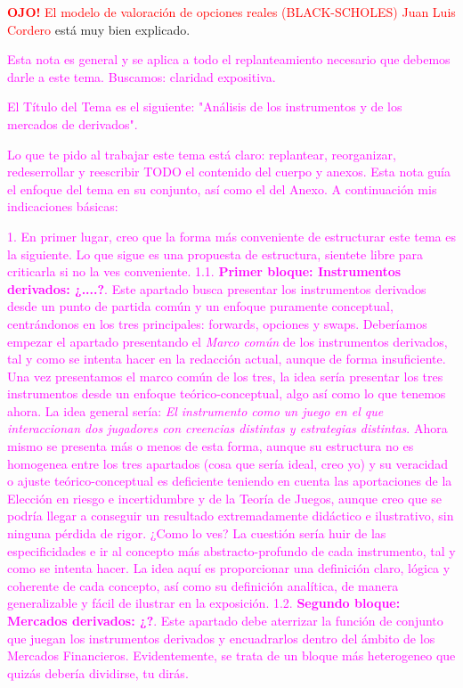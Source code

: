 \documentclass[10pt,a4paper]{article}
\newcommand{\modificaciones}[1]{
  \begin{tcolorbox}[
    colback=white,
    colframe=red,
    title={Modificaciones a realizar},
    before upper={\setlength{\parindent}{0.5cm}\setlength{\parskip}{0.5\baselineskip}}
  ]
  #1
  \end{tcolorbox}
}
\newcounter{anexo}
\begin{document}
\modificaciones{
    \textcolor{red}{\textbf{OJO!} El modelo de valoración de opciones reales (BLACK-SCHOLES) Juan Luis Cordero} está muy bien explicado.

    \textcolor{magenta}{Esta nota es general y se aplica a todo el replanteamiento necesario que debemos darle a este tema. Buscamos: claridad expositiva.

    El Título del Tema es el siguiente: "Análisis de los instrumentos y de los mercados de derivados".

    Lo que te pido al trabajar este tema está claro: replantear, reorganizar, redeserrollar y reescribir TODO el contenido del cuerpo y anexos. Esta nota guía el enfoque del tema en su conjunto, así como el del Anexo. A continuación mis indicaciones básicas:
    
    1. En primer lugar, creo que la forma más conveniente de estructurar este tema es la siguiente. Lo que sigue es una propuesta de estructura, sientete libre para criticarla si no la ves conveniente.
    1.1. \textbf{Primer bloque: Instrumentos derivados: ¿....?}. Este apartado busca presentar los instrumentos derivados desde un punto de partida común y un enfoque puramente conceptual, centrándonos en los tres principales: forwards, opciones y swaps. Deberíamos empezar el apartado presentando el \textit{Marco común} de los instrumentos derivados, tal y como se intenta hacer en la redacción actual, aunque de forma insuficiente. Una vez presentamos el marco común de los tres, la idea sería presentar los tres instrumentos desde un enfoque teórico-conceptual, algo así como lo que tenemos ahora. La idea general sería: \textit{El instrumento como un juego en el que interaccionan dos jugadores con creencias distintas y estrategias distintas}. Ahora mismo se presenta más o menos de esta forma, aunque su estructura no es homogenea entre los tres apartados (cosa que sería ideal, creo yo) y su veracidad o ajuste teórico-conceptual es deficiente teniendo en cuenta las aportaciones de la Elección en riesgo e incertidumbre y de la Teoría de Juegos, aunque creo que se podría llegar a conseguir un resultado extremadamente didáctico e ilustrativo, sin ninguna pérdida de rigor. ¿Como lo ves? La cuestión sería huir de las especificidades e ir al concepto más abstracto-profundo de cada instrumento, tal y como se intenta hacer.
    La idea aquí es proporcionar una definición claro, lógica y coherente de cada concepto, así como su definición analítica, de manera generalizable y fácil de ilustrar en la exposición. 
    1.2. \textbf{Segundo bloque: Mercados derivados: ¿?}. Este apartado debe aterrizar la función de conjunto que juegan los instrumentos derivados y encuadrarlos dentro del ámbito de los Mercados Financieros. Evidentemente, se trata de un bloque más heterogeneo que quizás debería dividirse, tu dirás. 
}}
\end{document}
